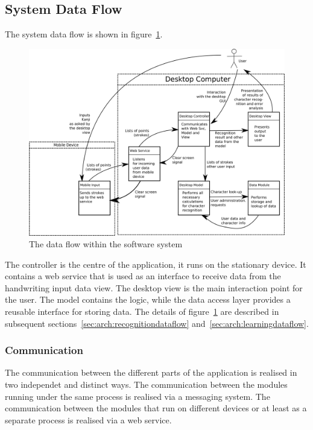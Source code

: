 \subsection{System Data Flow}
\label{sec:arch:systemdataflow}
The system data flow is shown in figure~\ref{fig:systemdataflow}.

\begin{figure}[htbp]
\begin{center}
\includegraphics[scale=0.7]{images/TechnicalDesign/SystemDataFlow.png}
\caption{The data flow within the software system}
\label{fig:systemdataflow}
\end{center}
\end{figure}
The controller is the centre of the application, it runs on the stationary
device. It contains a web service that is used as an interface to receive data 
from the handwriting input data view. The desktop view is the main interaction 
point for the user. The model contains the logic, while the data access layer 
provides a reusable interface for storing data. The details of 
figure~\ref{fig:systemdataflow} are described in subsequent 
sections~\ref{sec:arch:recognitiondataflow} and~\ref{sec:arch:learningdataflow}.

\subsubsection{Communication}
\label{sec:arch:communication}

The communication between the different parts of the application is realised 
in two independet and distinct ways. The communication between the 
modules running under the same process is realised via a messaging system. 
The communication between the modules that run on different devices
or at least as a separate process is realised via a web service.


